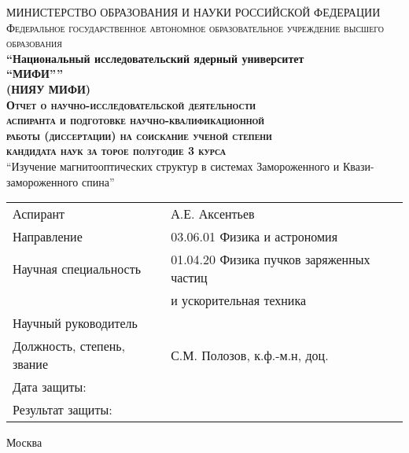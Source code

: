 \begin{titlepage}

\begin{center}
{МИНИСТЕРСТВО ОБРАЗОВАНИЯ И НАУКИ РОССИЙСКОЙ ФЕДЕРАЦИИ}\\[3pt]
\textsc{\small{Федеральное государственное автономное образовательное учреждение высшего образования}}\\

\textbf{\enquote{Национальный исследовательский ядерный университет\\
{``МИФИ''}}}\\
\textbf{(НИЯУ МИФИ)}\\[2cm]




\textsc{\textbf{Отчет о научно-исследовательской деятельности\\		
		аспиранта и подготовке научно-квалификационной\\	
		работы (диссертации) на соискание ученой степени\\		
		кандидата наук за торое полугодие 3 курса}}\\[2cm]

\enquote{Изучение магнитооптических структур в системах Замороженного и Квази-замороженного спина}\\[2cm]


\end{center}


\begin{flushleft}
\begin{tabular}{ll}
Аспирант 						& А.Е. Аксентьев \\
Направление                     & 03.06.01 Физика и астрономия \\					
Научная специальность		   	& 01.04.20 Физика пучков заряженных частиц\\
								& \-\hspace{1.8cm} и ускорительная техника \\[1cm]
Научный руководитель 			& \\
Должность, степень, звание 		& С.М. Полозов, к.ф.-м.н, доц. \\[1cm]
Дата защиты:					& \\
Результат защиты:				& \\
\end{tabular}

\end{flushleft}

\vfill


\begin{center}
Москва \the\year{}
\end{center}



\end{titlepage}